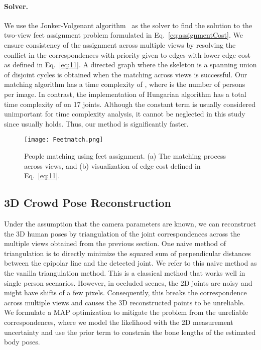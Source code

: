 \documentclass[runningheads]{llncs}
\begin{document}
\paragraph{\bf{Solver.}} We use the Jonker-Volgenant algorithm~\cite{jonker1987shortest} as the solver to find the solution to the two-view feet assignment problem formulated in Eq.~\ref{eq:assignmentCost}. We ensure consistency of the assignment across multiple views by resolving the conflict in the correspondences with priority given to edges with lower edge cost as defined in Eq.~\ref{eq:11}. 
A directed graph where the skeleton is a spanning union of disjoint cycles is obtained when the matching across  views is successful. Our matching algorithm has a time complexity of , where  is the number of persons per image. In contrast, the  implementation of Hungarian algorithm has a total time complexity of  on 17 joints. Although the constant term is usually considered unimportant for time complexity analysis, it cannot be neglected in this study since  usually holds. Thus, our method is significantly faster.
\begin{figure}[!hbt]
\centering
\texttt{[image: Feetmatch.png]}
\caption{People matching using feet assignment. (a) The matching process across  views, and (b) visualization of edge cost defined in Eq.~\ref{eq:11}.}
\label{fig:2}
\end{figure}
\vspace{-1.0cm} 
\subsection{3D Crowd Pose Reconstruction}
\label{sec:section_three}
Under the assumption that the camera parameters are known, we can reconstruct the 3D human poses by triangulation of the joint correspondences across the multiple views obtained from the previous section.
One naive method of triangulation is to directly minimize the squared sum of perpendicular distances between the epipolar line and the detected joint. We refer to this naive method as the vanilla triangulation method. This is a classical method that works well in single person scenarios. However, in occluded scenes, the 2D joints are noisy and might have shifts of a few pixels. Consequently, this breaks the correspondence across multiple views and causes the 3D reconstructed points to be unreliable. 
We formulate a MAP optimization
to mitigate the problem from the unreliable correspondences, where we model the likelihood with the 2D measurement uncertainty and use the prior term to constrain the bone lengths of the estimated body poses.  
\end{document}

